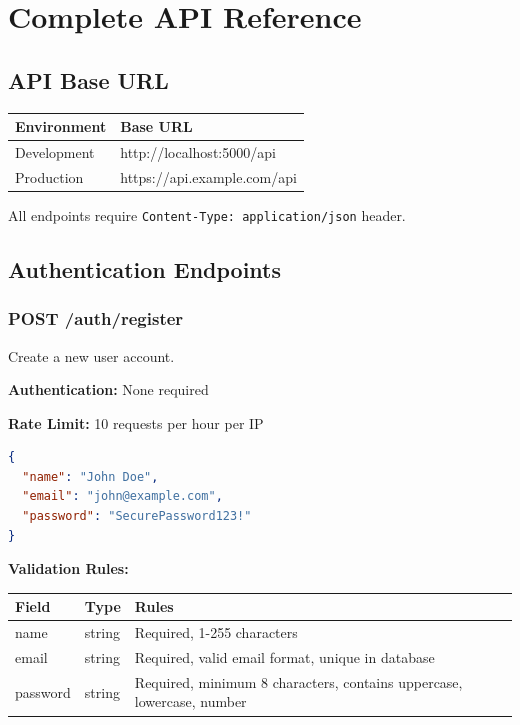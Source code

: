 \documentclass[12pt,a4paper,oneside]{article}
\begin{document}
\newpage


\section{Complete API Reference}

\subsection{API Base URL}

\begin{table}[H]
\centering
\begin{tabular}{|p{3cm}|p{9cm}|}
\hline
\textbf{Environment} & \textbf{Base URL} \\
\hline
Development & http://localhost:5000/api \\
\hline
Production & https://api.example.com/api \\
\hline
\end{tabular}
\end{table}

All endpoints require \texttt{Content-Type: application/json} header.

\subsection{Authentication Endpoints}

\subsubsection{POST /auth/register}

Create a new user account.

\textbf{Authentication:} None required

\textbf{Rate Limit:} 10 requests per hour per IP

\begin{lstlisting}[language=JSON, caption=Request Body]
{
  "name": "John Doe",
  "email": "john@example.com",
  "password": "SecurePassword123!"
}
\end{lstlisting}

\textbf{Validation Rules:}

\begin{table}[H]
\centering
\begin{tabular}{|p{2cm}|p{3cm}|p{7cm}|}
\hline
\textbf{Field} & \textbf{Type} & \textbf{Rules} \\
\hline
name & string & Required, 1-255 characters \\
\hline
email & string & Required, valid email format, unique in database \\
\hline
password & string & Required, minimum 8 characters, contains uppercase, lowercase, number \\
\hline
\end{tabular}
\end{table}
\end{document}
